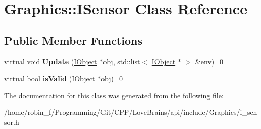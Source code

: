 \hypertarget{class_graphics_1_1_i_sensor}{}\section{Graphics\+:\+:I\+Sensor Class Reference}
\label{class_graphics_1_1_i_sensor}
\subsection*{Public Member Functions}
\begin{DoxyCompactItemize}
\item 
\hypertarget{class_graphics_1_1_i_sensor_a898b379aa5b3c1e3bd0123a321b2c68a}{}virtual void {\bfseries Update} (\hyperlink{class_graphics_1_1_i_object}{I\+Object} $\ast$obj, std\+::list$<$ \hyperlink{class_graphics_1_1_i_object}{I\+Object} $\ast$ $>$ \&env)=0\label{class_graphics_1_1_i_sensor_a898b379aa5b3c1e3bd0123a321b2c68a}

\item 
\hypertarget{class_graphics_1_1_i_sensor_a7bfe9af666729794a423231e2d91c7c4}{}virtual bool {\bfseries is\+Valid} (\hyperlink{class_graphics_1_1_i_object}{I\+Object} $\ast$obj)=0\label{class_graphics_1_1_i_sensor_a7bfe9af666729794a423231e2d91c7c4}

\end{DoxyCompactItemize}


The documentation for this class was generated from the following file\+:\begin{DoxyCompactItemize}
\item 
/home/robin\+\_\+f/\+Programming/\+Git/\+C\+P\+P/\+Love\+Brains/api/include/\+Graphics/i\+\_\+sensor.\+h\end{DoxyCompactItemize}
